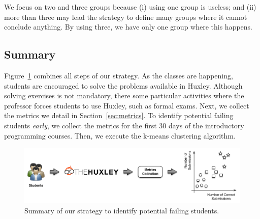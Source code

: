 We focus on two and three groups because (i) using one group is useless; and (ii) more than three may lead the strategy to define many groups where it cannot conclude anything. By using three, we have only one group where this happens.

\subsection{Summary}

Figure~\ref{fig:strategy} combines all steps of our strategy. As the classes are happening, students are encouraged to solve the problems available in Huxley. Although solving exercises is not mandatory, there some particular activities where the professor forces students to use Huxley, such as formal exams. Next, we collect the metrics we detail in Section~\ref{sec:metrics}. To identify potential failing students \textit{early}, we collect the metrics for the first 30 days of the introductory programming courses. Then, we execute the k-means clustering algorithm.

\begin{figure}[htb]
\centering
\includegraphics[width=1.0\textwidth,natwidth=610,natheight=642]{images/Strategy.pdf}
\caption{Summary of our strategy to identify potential failing students.}
\label{fig:strategy}
\end{figure}